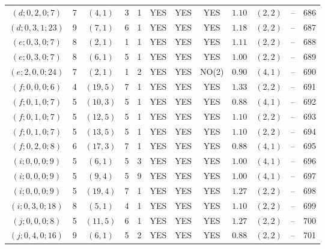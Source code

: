 \begin{longtable}{|c|c|c|c|c|c|c|c|c|c|c|c|}
$(d;0,2,0;7)$ & 7 & $(4,1)$ & 3 & 1 & YES & YES & YES & $1.10$ & $(2,2)$ & -- & 686\\
$(d;0,3,1;23)$ & 9 & $(7,1)$ & 6 & 1 & YES & YES & YES & $1.18$ & $(2,2)$ & -- & 687\\
$(e;0,3,0;7)$ & 8 & $(2,1)$ & 1 & 1 & YES & YES & YES & $1.11$ & $(2,2)$ & -- & 688\\
$(e;0,3,0;7)$ & 8 & $(6,1)$ & 5 & 1 & YES & YES & YES & $1.00$ & $(2,2)$ & -- & 689\\
$(e;2,0,0;24)$ & 7 & $(2,1)$ & 1 & 2 & YES & YES & NO(2) & $0.90$ & $(4,1)$ & -- & 690\\
$(f;0,0,0;6)$ & 4 & $(19,5)$ & 7 & 1 & YES & YES & YES & $1.33$ & $(2,2)$ & -- & 691\\
$(f;0,1,0;7)$ & 5 & $(10,3)$ & 5 & 1 & YES & YES & YES & $0.88$ & $(4,1)$ & -- & 692\\
$(f;0,1,0;7)$ & 5 & $(12,5)$ & 5 & 1 & YES & YES & YES & $1.10$ & $(2,2)$ & -- & 693\\
$(f;0,1,0;7)$ & 5 & $(13,5)$ & 5 & 1 & YES & YES & YES & $1.10$ & $(2,2)$ & -- & 694\\
$(f;0,2,0;8)$ & 6 & $(17,3)$ & 7 & 1 & YES & YES & YES & $0.88$ & $(4,1)$ & -- & 695\\
$(i;0,0,0;9)$ & 5 & $(6,1)$ & 5 & 3 & YES & YES & YES & $1.00$ & $(4,1)$ & -- & 696\\
$(i;0,0,0;9)$ & 5 & $(9,4)$ & 5 & 9 & YES & YES & YES & $1.00$ & $(4,1)$ & -- & 697\\
$(i;0,0,0;9)$ & 5 & $(19,4)$ & 7 & 1 & YES & YES & YES & $1.27$ & $(2,2)$ & -- & 698\\
$(i;0,3,0;18)$ & 8 & $(5,1)$ & 4 & 1 & YES & YES & YES & $1.10$ & $(2,2)$ & -- & 699\\
$(j;0,0,0;8)$ & 5 & $(11,5)$ & 6 & 1 & YES & YES & YES & $1.27$ & $(2,2)$ & -- & 700\\
$(j;0,4,0;16)$ & 9 & $(6,1)$ & 5 & 2 & YES & YES & YES & $0.88$ & $(2,2)$ & -- & 701
\end{longtable}
